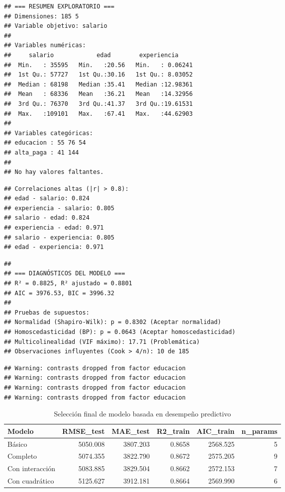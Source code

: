 \documentclass[
  oneside]{book}
\begin{document}
\begin{verbatim}
## === RESUMEN EXPLORATORIO ===
## Dimensiones: 185 5 
## Variable objetivo: salario 
## 
## Variables numéricas:
##     salario            edad        experiencia      
##  Min.   : 35595   Min.   :20.56   Min.   : 0.06241  
##  1st Qu.: 57727   1st Qu.:30.16   1st Qu.: 8.03052  
##  Median : 68198   Median :35.41   Median :12.98361  
##  Mean   : 68336   Mean   :36.21   Mean   :14.32956  
##  3rd Qu.: 76370   3rd Qu.:41.37   3rd Qu.:19.61531  
##  Max.   :109101   Max.   :67.41   Max.   :44.62903  
## 
## Variables categóricas:
## educacion : 55 76 54 
## alta_paga : 41 144 
## 
## No hay valores faltantes.
\end{verbatim}

\begin{verbatim}
## Correlaciones altas (|r| > 0.8):
## edad - salario: 0.824
## experiencia - salario: 0.805
## salario - edad: 0.824
## experiencia - edad: 0.971
## salario - experiencia: 0.805
## edad - experiencia: 0.971
\end{verbatim}

\begin{verbatim}
## 
## === DIAGNÓSTICOS DEL MODELO ===
## R² = 0.8825, R² ajustado = 0.8801
## AIC = 3976.53, BIC = 3996.32
## 
## Pruebas de supuestos:
## Normalidad (Shapiro-Wilk): p = 0.8302 (Aceptar normalidad)
## Homoscedasticidad (BP): p = 0.0643 (Aceptar homoscedasticidad)
## Multicolinealidad (VIF máximo): 17.71 (Problemática)
## Observaciones influyentes (Cook > 4/n): 10 de 185
\end{verbatim}

\begin{verbatim}
## Warning: contrasts dropped from factor educacion
## Warning: contrasts dropped from factor educacion
## Warning: contrasts dropped from factor educacion
## Warning: contrasts dropped from factor educacion
\end{verbatim}

\begin{table}
\centering
\caption{\label{tab:flujo-completo}Selección final de modelo basada en desempeño predictivo}
\centering
\begin{tabular}[t]{l|r|r|r|r|r}
\hline
Modelo & RMSE\_test & MAE\_test & R2\_train & AIC\_train & n\_params\\
\hline
Básico & 5050.008 & 3807.203 & 0.8658 & 2568.525 & 5\\
\hline
Completo & 5074.355 & 3822.790 & 0.8672 & 2575.205 & 9\\
\hline
Con interacción & 5083.885 & 3829.504 & 0.8662 & 2572.153 & 7\\
\hline
Con cuadrático & 5125.627 & 3912.181 & 0.8664 & 2569.990 & 6\\
\hline
\end{tabular}
\end{table}
\end{document}

